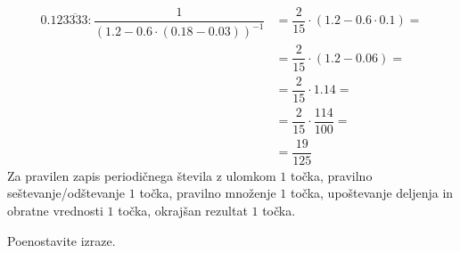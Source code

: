 \documentclass[addpoints]{exam}
\begin{document}
\begin{questions}
\begin{parts}
        \begin{solution}[4cm]
            \begin{align*}
                0.12\overline{3333}: \dfrac{1}{\left(1.2-0.6\cdot\left(0.18-0.03\right)\right)^{-1}} &= \dfrac{2}{15}\cdot \left(1.2-0.6\cdot 0.1\right)= \\
                                                                                        &= \dfrac{2}{15}\cdot \left(1.2-0.06\right)= \\
                                                                                        &= \dfrac{2}{15}\cdot 1.14= \\
                                                                                        &= \dfrac{2}{15}\cdot \dfrac{114}{100}= \\
                                                                                        &= \dfrac{19}{125}
            \end{align*}
            Za pravilen zapis periodičnega števila z ulomkom $1$ točka, pravilno seštevanje/odštevanje $1$ točka, pravilno množenje $1$ točka, upoštevanje deljenja in obratne vrednosti $1$ točka, okrajšan rezultat $1$ točka.
        \end{solution}

    \end{parts}






    \newpage


        \question
        Poenostavite izraze.
\end{questions}
\end{document}
